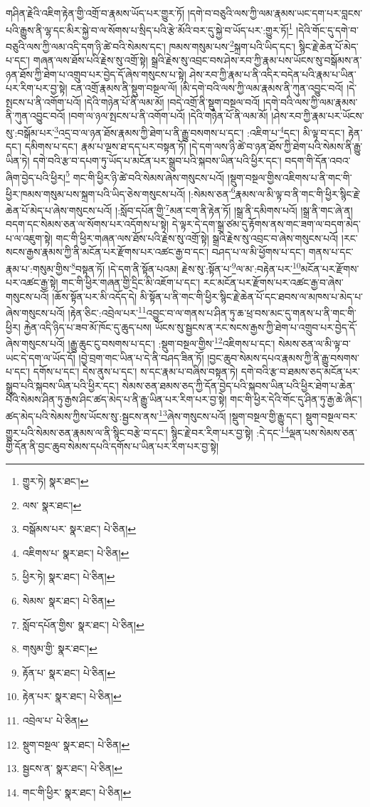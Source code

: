 གཤིན་རྗེའི་འཇིག་རྟེན་གྱི་འགྲོ་བ་རྣམས་ཡོད་པར་གྱུར་ཏོ། །དགེ་བ་བཅུའི་ལས་ཀྱི་ལམ་རྣམས་ཡང་དག་པར་བླངས་པའི་རྒྱུས་ནི་ལྷ་དང་མིར་སྐྱེ་བ་ལ་སོགས་པ་སྲིད་པའི་རྩེ་མོའི་བར་དུ་སྐྱེ་བ་ཡོད་པར་:གྱུར་ཏོ།\footnote{གྱུར་ཏེ།  སྣར་ཐང་། } །དེའི་གོང་དུ་དགེ་བ་བཅུའི་ལས་ཀྱི་ལམ་འདི་དག་ཉི་ཚེ་བའི་སེམས་དང་། ཁམས་གསུམ་པས་\footnote{ལས་  སྣར་ཐང་། }སྐྲག་པའི་ཡིད་དང་། སྙིང་རྗེ་ཆེན་པོ་མེད་པ་དང་། གཞན་ལས་ཐོས་པའི་རྗེས་སུ་འགྲོ་སྟེ། སྒྲའི་རྗེས་སུ་འབྲང་བས་ཤེས་རབ་ཀྱི་རྣམ་པས་ཡོངས་སུ་བསྒོམས་ན་ཉན་ཐོས་ཀྱི་ཐེག་པ་འགྲུབ་པར་བྱེད་དོ་ཞེས་གསུངས་པ་སྟེ། ཤེས་རབ་ཀྱི་རྣམ་པ་ནི་འདིར་བདེན་པའི་རྣམ་པ་ཡིན་པར་རིག་པར་བྱ་སྟེ། ངན་འགྲོ་རྣམས་ནི་སྡུག་བསྔལ་ལོ། །མི་དགེ་བའི་ལས་ཀྱི་ལམ་རྣམས་ནི་ཀུན་འབྱུང་བའོ། །དེ་སྤངས་པ་ནི་འགོག་པའོ། །དེའི་གཉེན་པོ་ནི་ལམ་མོ། །བདེ་འགྲོ་ནི་སྡུག་བསྔལ་བའོ། །དགེ་བའི་ལས་ཀྱི་ལམ་རྣམས་ནི་ཀུན་འབྱུང་བའོ། །བག་ལ་ཉལ་སྤངས་པ་ནི་འགོག་པའོ། །དེའི་གཉེན་པོ་ནི་ལམ་མོ། །ཤེས་རབ་ཀྱི་རྣམ་པར་ཡོངས་སུ་:བསྒོམ་པར་\footnote{བསྒོམས་པར་  སྣར་ཐང་།  པེ་ཅིན། }འདྲ་བ་ལ་ཉན་ཐོས་རྣམས་ཀྱི་ཐེག་པ་ནི་རྒྱུ་བསགས་པ་དང་། :འཇིག་པ་\footnote{འཇིགས་པ་  སྣར་ཐང་།  པེ་ཅིན། }དང་། མི་ལྟ་བ་དང་། རྟེན་དང་། དམིགས་པ་དང་། རྣམ་པ་ལྔས་ཐ་དད་པར་བསྟན་ཏོ། །དེ་དག་ལས་ཉི་ཚེ་བ་ཉན་ཐོས་ཀྱི་ཐེག་པའི་སེམས་ནི་རྒྱུ་ཡིན་ཏེ། དགེ་བའི་རྩ་བ་དཔག་ཏུ་ཡོད་པ་མངོན་པར་སྒྲུབ་པའི་སྐབས་ཡིན་པའི་ཕྱིར་དང་། བདག་གི་དོན་འབའ་ཞིག་བྱེད་པའི་ཕྱིར།\footnote{ཕྱིར་ཏེ།  སྣར་ཐང་།  པེ་ཅིན། } གང་གི་ཕྱིར་ཉི་ཚེ་བའི་སེམས་ཞེས་གསུངས་པའོ། །སྡུག་བསྔལ་གྱིས་འཇིགས་པ་ནི་གང་གི་ཕྱིར་ཁམས་གསུམ་པས་སྐྲག་པའི་ཡིད་ཅེས་གསུངས་པའོ། །:སེམས་ཅན་\footnote{སེམས་  སྣར་ཐང་།  པེ་ཅིན། }རྣམས་ལ་མི་ལྟ་བ་ནི་གང་གི་ཕྱིར་སྙིང་རྗེ་ཆེན་པོ་མེད་པ་ཞེས་གསུངས་པའོ། །:སློབ་དཔོན་གྱི་\footnote{སློབ་དཔོན་གྱིས་  སྣར་ཐང་།  པེ་ཅིན། }མན་ངག་ནི་རྟེན་ཏོ། །སྒྲ་ནི་དམིགས་པའོ། །སྒྲ་ནི་གང་ཞེ་ན། བདག་དང་སེམས་ཅན་ལ་སོགས་པར་འདོགས་པ་སྟེ། དེ་ལྟར་དེ་དག་སྒྲ་ཙམ་དུ་རྟོགས་ནས་གང་ཟག་ལ་བདག་མེད་པ་ལ་འཇུག་སྟེ། གང་གི་ཕྱིར་གཞན་ལས་ཐོས་པའི་རྗེས་སུ་འགྲོ་སྟེ། སྒྲའི་རྗེས་སུ་འབྲང་བ་ཞེས་གསུངས་པའོ། །རང་སངས་རྒྱས་རྣམས་ཀྱི་ནི་མངོན་པར་རྫོགས་པར་འཚང་རྒྱ་བ་དང་། བཤད་པ་ལ་མི་ཕྱོགས་པ་དང་། གནས་པ་དང་རྣམ་པ་:གསུམ་གྱིས་\footnote{གསུམ་གྱི་  སྣར་ཐང་། }བསྟན་ཏོ། །དེ་དག་ནི་སྟོན་པའམ། རྗེས་སུ་:སྟོན་པ་\footnote{རྟོན་པ་  སྣར་ཐང་།  པེ་ཅིན། }ལ་མ་:བརྟེན་པར་\footnote{རྟེན་པར་  སྣར་ཐང་།  པེ་ཅིན། }མངོན་པར་རྫོགས་པར་འཚང་རྒྱ་སྟེ། གང་གི་ཕྱིར་གཞན་གྱི་དྲིང་མི་འཇོག་པ་དང་། རང་མངོན་པར་རྫོགས་པར་འཚང་རྒྱ་བ་ཞེས་གསུངས་པའོ། །ཆོས་སྟོན་པར་མི་འདོད་དེ། མི་སྟོན་པ་ནི་གང་གི་ཕྱིར་སྙིང་རྗེ་ཆེན་པོ་དང་ཐབས་ལ་མཁས་པ་མེད་པ་ཞེས་གསུངས་པའོ། །རྟེན་ཅིང་:འབྲེལ་པར་\footnote{འབྲེལ་པ་  པེ་ཅིན། }འབྱུང་བ་ལ་གནས་པ་ཤིན་ཏུ་ཆ་ཕྲ་བས་མང་དུ་གནས་པ་ནི་གང་གི་ཕྱིར། རྐྱེན་འདི་ཉིད་པ་ཟབ་མོ་ཁོང་དུ་ཆུད་པས། ཡོངས་སུ་སྦྱངས་ན་རང་སངས་རྒྱས་ཀྱི་ཐེག་པ་འགྲུབ་པར་བྱེད་དོ་ཞེས་གསུངས་པའོ། །རྒྱུ་ཆུང་ངུ་བསགས་པ་དང་། :སྡུག་བསྔལ་གྱིས་\footnote{སྡུག་བསྔལ་  སྣར་ཐང་།  པེ་ཅིན། }འཇིགས་པ་དང་། སེམས་ཅན་ལ་མི་ལྟ་བ་ཡང་དེ་དག་ལ་ཡོད་དོ། །བྱེ་བྲག་གང་ཡིན་པ་དེ་ནི་བཤད་ཟིན་ཏོ། །བྱང་ཆུབ་སེམས་དཔའ་རྣམས་ཀྱི་ནི་རྒྱུ་བསགས་པ་དང་། དགོས་པ་དང་། དེས་ནུས་པ་དང་། ས་དང་རྣམ་པ་བཞིས་བསྟན་ཏེ། དགེ་བའི་རྩ་བ་ཐམས་ཅད་མངོན་པར་སྒྲུབ་པའི་སྐབས་ཡིན་པའི་ཕྱིར་དང་། སེམས་ཅན་ཐམས་ཅད་ཀྱི་དོན་བྱེད་པའི་སྐབས་ཡིན་པའི་ཕྱིར་ཐེག་པ་ཆེན་པོའི་སེམས་ཤིན་ཏུ་རྒྱས་ཤིང་ཚད་མེད་པ་ནི་རྒྱུ་ཡིན་པར་རིག་པར་བྱ་སྟེ། གང་གི་ཕྱིར་དེའི་གོང་དུ་ཤིན་ཏུ་རྒྱ་ཆེ་ཞིང་། ཚད་མེད་པའི་སེམས་ཀྱིས་ཡོངས་སུ་:སྦྱངས་ནས་\footnote{སྦྱངས་ན་  སྣར་ཐང་།  པེ་ཅིན། }ཞེས་གསུངས་པའོ། །སྡུག་བསྔལ་གྱི་རྒྱུ་དང་། སྡུག་བསྔལ་བར་གྱུར་པའི་སེམས་ཅན་རྣམས་ལ་ནི་སྙིང་བརྩེ་བ་དང་། སྙིང་རྗེ་བར་རིག་པར་བྱ་སྟེ། :དེ་དང་\footnote{གང་གི་ཕྱིར་  སྣར་ཐང་།  པེ་ཅིན། }ལྡན་པས་སེམས་ཅན་གྱི་དོན་ནི་བྱང་ཆུབ་སེམས་དཔའི་དགོས་པ་ཡིན་པར་རིག་པར་བྱ་སྟེ། 